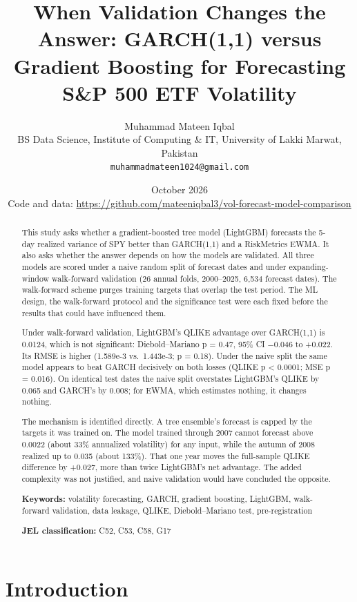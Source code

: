 \documentclass[11pt]{article}
\title{When Validation Changes the Answer: GARCH(1,1) versus Gradient Boosting for Forecasting S\&P 500 ETF Volatility}
\author{Muhammad Mateen Iqbal\\[2pt]
  {\normalsize BS Data Science, Institute of Computing \& IT, University of Lakki Marwat, Pakistan}\\
  {\normalsize\texttt{muhammadmateen1024@gmail.com}}}
\date{October 2026\\[2pt] {\small Code and data: \url{https://github.com/mateeniqbal3/vol-forecast-model-comparison}}}
\begin{document}
\maketitle
\thispagestyle{empty}

\begin{abstract}
This study asks whether a gradient-boosted tree model (LightGBM) forecasts
the 5-day realized variance of SPY better than GARCH(1,1) and a RiskMetrics
EWMA. It also asks whether the answer depends on how the models are
validated. All three models are scored under a naive random split of
forecast dates and under expanding-window walk-forward validation (26
annual folds, 2000--2025, 6,534 forecast dates). The walk-forward scheme
purges training targets that overlap the test period. The ML design, the
walk-forward protocol and the significance test were each fixed before the
results that could have influenced them.

Under walk-forward validation, LightGBM's QLIKE advantage over GARCH(1,1)
is 0.0124, which is not significant: Diebold--Mariano p = 0.47, 95\% CI
−0.046 to +0.022. Its RMSE is higher (1.589e-3 vs.~1.443e-3; p = 0.18).
Under the naive split the same model appears to beat GARCH decisively on
both losses (QLIKE p \textless{} 0.0001; MSE p = 0.016). On identical test dates the
naive split overstates LightGBM's QLIKE by 0.065 and GARCH's by 0.008; for
EWMA, which estimates nothing, it changes nothing.

The mechanism is identified directly. A tree ensemble's forecast is capped
by the targets it was trained on. The model trained through 2007 cannot
forecast above 0.0022 (about 33\% annualized volatility) for any input,
while the autumn of 2008 realized up to 0.035 (about 133\%). That one year
moves the full-sample QLIKE difference by +0.027, more than twice
LightGBM's net advantage. The added complexity was not justified, and
naive validation would have concluded the opposite.

\medskip
\noindent \textbf{Keywords:} volatility forecasting, GARCH, gradient boosting, LightGBM,
walk-forward validation, data leakage, QLIKE, Diebold--Mariano test,
pre-registration

\noindent \textbf{JEL classification:} C52, C53, C58, G17
\end{abstract}

\hypertarget{introduction}{%
\section{Introduction}\label{introduction}}
\end{document}
